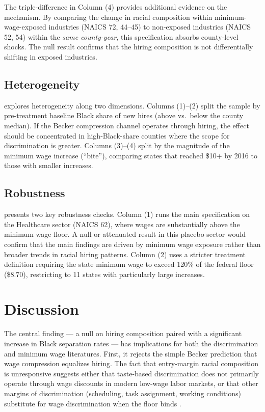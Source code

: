 \documentclass[12pt]{article}
\begin{document}
The triple-difference in Column (4) provides additional evidence on the mechanism. By comparing the change in racial composition within minimum-wage-exposed industries (NAICS 72, 44--45) to non-exposed industries (NAICS 52, 54) within the \textit{same county-year}, this specification absorbs county-level shocks. The null result confirms that the hiring composition is not differentially shifting in exposed industries.

\subsection{Heterogeneity}



 explores heterogeneity along two dimensions. Columns (1)--(2) split the sample by pre-treatment baseline Black share of new hires (above vs.\ below the county median). If the Becker compression channel operates through hiring, the effect should be concentrated in high-Black-share counties where the scope for discrimination is greater. Columns (3)--(4) split by the magnitude of the minimum wage increase (``bite''), comparing states that reached \$10+ by 2016 to those with smaller increases.

\subsection{Robustness}



 presents two key robustness checks. Column (1) runs the main specification on the Healthcare sector (NAICS 62), where wages are substantially above the minimum wage floor. A null or attenuated result in this placebo sector would confirm that the main findings are driven by minimum wage exposure rather than broader trends in racial hiring patterns. Column (2) uses a stricter treatment definition requiring the state minimum wage to exceed 120\% of the federal floor (\$8.70), restricting to 11 states with particularly large increases.


\section{Discussion}

The central finding --- a null on hiring composition paired with a significant increase in Black separation rates --- has implications for both the discrimination and minimum wage literatures. First, it rejects the simple Becker prediction that wage compression equalizes hiring. The fact that entry-margin racial composition is unresponsive suggests either that taste-based discrimination does not primarily operate through wage discounts in modern low-wage labor markets, or that other margins of discrimination (scheduling, task assignment, working conditions) substitute for wage discrimination when the floor binds \citep{lang2020racial}.
\end{document}

